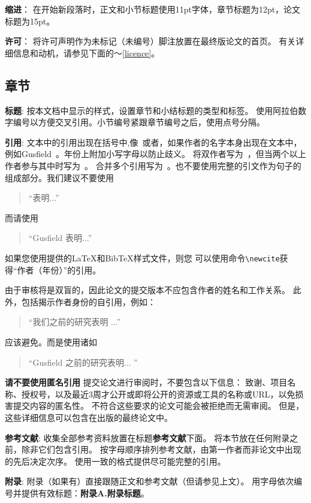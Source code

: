 \documentclass[11pt]{article}
\begin{document}
\begin{CJK*}{UTF8}{gbsn}
{\bf 缩进}：
在开始新段落时，正文和小节标题使用11pt字体，章节标题为12pt，论文标题为15pt。

{\bf 许可}：
将许可声明作为未标记（未编号）脚注放置在最终版论文的首页。
有关详细信息和动机，请参见下面的〜\ref{licence}。

\subsection{章节}

{\bf 标题}:
按本文档中显示的样式，设置章节和小结标题的类型和标签。
使用阿拉伯数字编号以方便交叉引用。小节编号紧跟章节编号之后，使用点号分隔。


{\bf 引用}: 
文本中的引用出现在括号中,像~\cite{Gusfield:97}或者，如果作者的名字本身出现在文本中，例如Gusfield~。年份上附加小写字母以防止歧义。
将双作者写为~\cite{Aho:72}，但当两个以上作者参与其中时写为~\cite{Chandra:81}。
合并多个引用写为~\cite{Gusfield:97,Aho:72}。也不要使用完整的引文作为句子的组成部分。我们建议不要使用
\begin{quote}
  ``\cite{Gusfield:97}表明...''
\end{quote}
而请使用
\begin{quote}
``Gusfield 表明...''
\end{quote}
如果您使用提供的\LaTeX{}和Bib\TeX{}样式文件，则您
可以使用命令\verb|\newcite|获得“作者（年份）”的引用。

由于审核将是双盲的，因此论文的提交版本不应包含作者的姓名和工作关系。
此外，包括揭示作者身份的自引用，例如：
\begin{quote}
``我们之前的研究表明\cite{Gusfield:97} ...''  
\end{quote}
应该避免。而是使用诸如
\begin{quote}
``Gusfield 
之前的研究表明... ''
\end{quote}

\textbf{请不要使用匿名引用} 
提交论文进行审阅时，不要包含以下信息：
致谢、项目名称、授权号，以及最近3周才公开或即将公开的资源或工具的名称或URL，以免损害提交内容的匿名性。
不符合这些要求的论文可能会被拒绝而无需审阅。
但是，这些详细信息可以包含在出版的最终论文中。

\textbf{参考文献}: 
收集全部参考资料放置在标题{\bf 参考文献}下面。
将本节放在任何附录之前，除非它们包含引用。
按字母顺序排列参考文献，由第一作者而非论文中出现的先后决定次序。
使用一致的格式提供尽可能完整的引用。

{\bf 附录}:
附录（如果有）直接跟随正文和参考文献（但请参见上文）。
用字母依次编号并提供有效标题：{\bf 附录A.附录标题}。


\end{CJK*}
\end{document}
